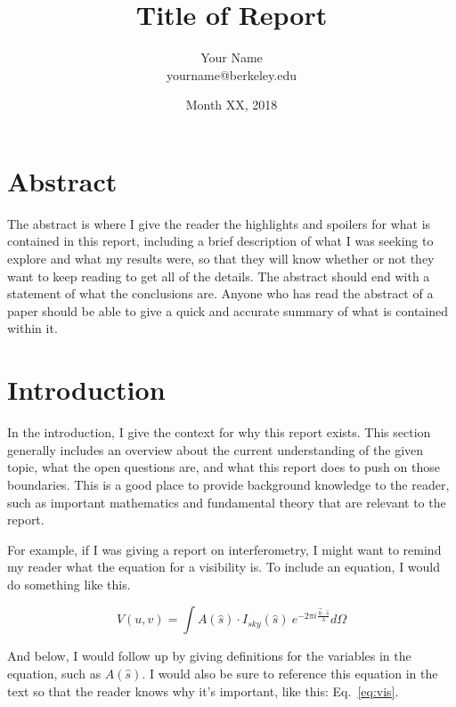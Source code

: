 \documentclass[11pt]{article}
\makeatletter
\newcommand{\thetitle}{Title of Report}
\newcommand{\theauthor}{Your Name}
\newcommand{\theauthorsemail}{yourname@berkeley.edu}
\newcommand{\thedate}{Month XX, 2018}
\makeatother
\begin{document}
\title{
    \sffamily\bfseries\huge
    \thetitle \\
}
\author{
    \sffamily\theauthor \\
    \sffamily\theauthorsemail
}
\date{\thedate}
\maketitle
\sloppy

\section{Abstract}

The abstract is where I give the reader the highlights and spoilers for what is 
contained in this report, including a brief description of what I was seeking 
to explore and what my results were, so that they will know whether or not they 
want to keep reading to get all of the details. The abstract should end with a 
statement of what the conclusions are.  Anyone who has read the abstract of a 
paper should be able to give a quick and accurate summary of what is contained 
within it.

\section{Introduction}

In the introduction, I give the context for why this report exists. This 
section generally includes an overview about the current understanding of the 
given topic, what the open questions are, and what this report does to push on 
those boundaries. This is a good place to provide background knowledge to the 
reader, such as important mathematics and fundamental theory that are relevant 
to the report.

For example, if I was giving a report on interferometry, I might want to remind 
my reader what the equation for a visibility is. To include an equation, I 
would do something like this.

\begin{equation}
    \label{eq:vis}
    V(u,v) = \int A(\hat{s}) \cdot I_{sky}(\hat{s}) ~e^{-2 \pi i \frac{\vec{b} 
    \cdot \hat{s}}{\lambda}} d\Omega
\end{equation}

And below, I would follow up by giving definitions for the variables in the 
equation, such as $A(\hat{s})$. I would also be sure to reference this equation 
in the text so that the reader knows why it's important, like this: 
Eq.~\eqref{eq:vis}.
\end{document}
